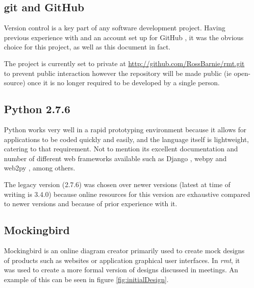 \subsection{git and GitHub}
Version control is a key part of any software development project.
Having previous experience with and an account set up for GitHub \citeyearpar{github}, it was the obvious choice for this project, as well as this document in fact.

The project is currently set to private at \url{http://github.com/RossBarnie/rmt.git} to prevent public interaction however the repository will be made public (ie open-source) once it is no longer required to be developed by a single person.

\subsection{Python 2.7.6}
Python works very well in a rapid prototyping environment because it allows for applications to be coded quickly and easily, and the language itself is lightweight, catering to that requirement.
Not to mention its excellent documentation and number of different web frameworks available such as Django \citep{django}, webpy \citep{webpy} and web2py \citeyearpar{web2py}, among others.

The legacy version (2.7.6) was chosen over newer versions (latest at time of writing is 3.4.0) because online resources for this version are exhaustive compared to newer versions and because of prior experience with it.

\subsection{Mockingbird}
Mockingbird \citep{mockingbird} is an online diagram creator primarily used to create mock designs of products such as websites or application graphical user interfaces.
In \emph{rmt}, it was used to create a more formal version of designs discussed in meetings.
An example of this can be seen in figure \ref{fig:initialDesign}.

